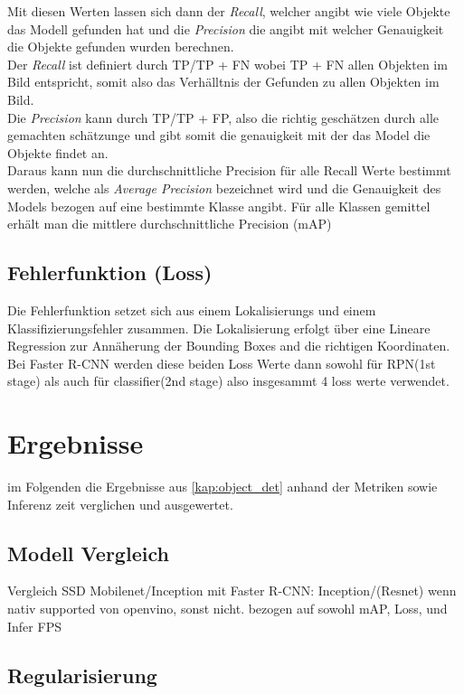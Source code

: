 Mit diesen Werten lassen sich dann der \textit{Recall}, welcher angibt wie 
viele Objekte das Modell gefunden hat und die \textit{Precision}
die angibt mit welcher Genauigkeit die Objekte gefunden wurden
berechnen.
\\
Der \textit{Recall} ist definiert durch TP/TP + FN
wobei TP + FN allen Objekten im Bild entspricht, somit also das 
Verhälltnis der Gefunden zu allen Objekten im Bild.
\\
Die \textit{Precision} kann durch TP/TP + FP, also die richtig 
geschätzen durch alle gemachten schätzunge und gibt somit die 
genauigkeit mit der das Model die Objekte findet an.
\\
Daraus kann nun die durchschnittliche Precision für alle Recall 
Werte bestimmt werden, welche als \textit{Average Precision}
bezeichnet wird und die Genauigkeit des Models bezogen auf 
eine bestimmte Klasse angibt. Für alle Klassen gemittel 
erhält man die mittlere durchschnittliche Precision (mAP)


\subsection*{Fehlerfunktion (Loss)}
Die Fehlerfunktion setzet sich aus einem Lokalisierungs und einem 
Klassifizierungsfehler zusammen. 
Die Lokalisierung erfolgt über eine Lineare Regression zur 
Annäherung der Bounding Boxes and die richtigen Koordinaten.\\

Bei Faster R-CNN werden diese beiden Loss Werte dann sowohl für 
RPN(1st stage) als auch für classifier(2nd stage) also 
insgesammt 4 loss werte verwendet.

\section{Ergebnisse}\label{sec:results}
im Folgenden die Ergebnisse aus \ref{kap:object_det} anhand der 
Metriken sowie Inferenz zeit verglichen und ausgewertet.


\subsection{Modell Vergleich}\label{sec:model_vergl}

Vergleich SSD Mobilenet/Inception mit Faster R-CNN: Inception/(Resnet)
wenn nativ supported von openvino, sonst nicht. bezogen auf sowohl 
mAP, Loss, und Infer FPS


\subsection{Regularisierung}\label{subsec:regularisierung}


